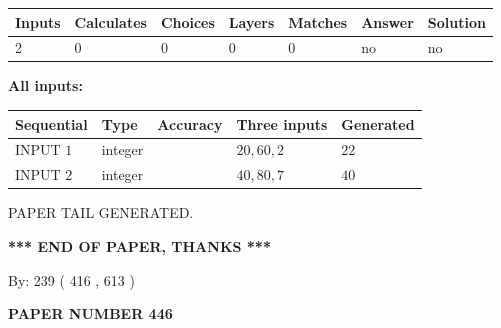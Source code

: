 \documentclass[12pt]{article}
\begin{document}
   
   
   
\noindent\begin{tabular}{|l|l|l|l|l|l|l|}
 \hline
Inputs & Calculates & Choices & Layers & Matches & Answer & Solution \\ \hline
 2  & 
 0  & 
 0
  & 
 0  & 
 0  & 
  no & 
  no 
  \\ \hline
 \end{tabular}
   
   
   
   
\noindent{}
   
   
   
   
\noindent\vspace{0.1in}\hspace{-0.08in} {\textbf{\Large{All inputs: }}}
   
   
  
  
\noindent\begin{tabular}{|l|l|l|l|l|}
\hline
 Sequential & Type & Accuracy & Three inputs & Generated \\ 
\hline
 
 
  INPUT $  1 $ & integer &  & $
 20
 , 
 60
 , 
 2
 $ & $ 22 $ 
 \\  \hline  
 
 
  INPUT $  2 $ & integer &  & $
 40
 , 
 80
 , 
 7
 $ & $ 40 $ 
 \\  \hline  
 \end{tabular}
   
   
   
   
   
   
 \vspace{0.2in}
 
   
   
\vspace{2.0in} PAPER TAIL GENERATED.
   
   
   
   
\vspace{1.0in} 
{\textbf{\large{ *** END OF PAPER, THANKS *** }}} 
   
   
\hspace{1.0in} By: 
 239 ( 416 ,  613 )
   
   
   
   
\newpage 
\setcounter{page}{ 
   446001 } 
   
   
   
   
 {\textbf{ \Large{ PAPER NUMBER  446  }}}
   
\end{document}
